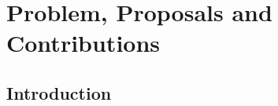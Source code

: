 \documentclass[./dissertation.tex]{subfiles}
\begin{document}
\chapter{Problem, Proposals and Contributions}

\section{Introduction}
\end{document}
